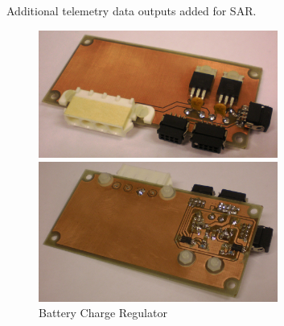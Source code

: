 Additional telemetry data outputs added for SAR.

\begin{figure}[H]
\begin{minipage}[t]{\linewidth}
\centering
\includegraphics[width=0.7\textwidth]{figures/fig_SAR_top}
\end{minipage}
\vspace{2mm}
\begin{minipage}[t]{\linewidth}
\centering
\includegraphics[width=0.7\textwidth]{figures/fig_SAR_bottom}
\end{minipage}
\caption{Battery Charge Regulator}
\label{fig:SAR_top_bottom}
\end{figure}

